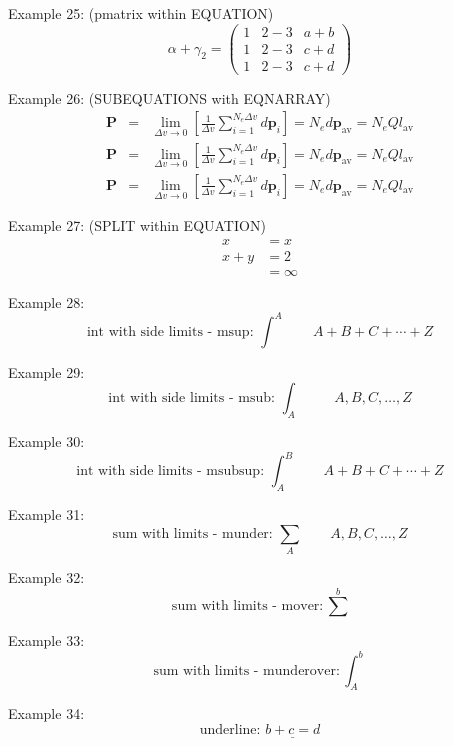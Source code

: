 \documentclass{book}
\begin{document}
\noindent Example 25: (pmatrix within EQUATION)
\begin{equation*}
\alpha + \gamma_{2} = \begin{pmatrix}
1 &2-3 &a+b\\ 
1 &2-3 &c+d\\
1 &2-3 &c+d
\end{pmatrix}
\end{equation*}

\noindent Example 26: (SUBEQUATIONS with EQNARRAY)
\begin{subequations}
\begin{eqnarray}
\mathbf{P} &= &\lim_{\Delta v\to 0} \left[\frac{1}{\Delta v}\sum_{i=1}^{N_{e}\Delta v}d\mathbf{p}_{i}\right] = N_{e}d\mathbf{p}_{\mathrm{av}} = N_{e}Q{l}_{\mathrm{av}} \nonumber \\
\mathbf{P} &= &\lim_{\Delta v\to 0} \left[\frac{1}{\Delta v}\sum_{i=1}^{N_{e}\Delta v}d\mathbf{p}_{i}\right] = N_{e}d\mathbf{p}_{\mathrm{av}} = N_{e}Q{l}_{\mathrm{av}} \\
\mathbf{P} &= &\lim_{\Delta v\to 0} \left[\frac{1}{\Delta v}\sum_{i=1}^{N_{e}\Delta v}d\mathbf{p}_{i}\right] = N_{e}d\mathbf{p}_{\mathrm{av}} = N_{e}Q{l}_{\mathrm{av}} 
\end{eqnarray}
\end{subequations}

\noindent Example 27: (SPLIT within EQUATION)
\begin{equation}
\begin{split}
x &= x\\
x + y&=2 \\
  &= \infty
\end{split}
\end{equation}

\noindent Example 28:
\[
\mbox{int with side limits - msup: } \int^{A}\qquad A + B + C + \cdots + Z
\]

\noindent Example 29:
\[\mbox{int with side limits - msub: } \int_{A}\qquad A, B, C, \ldots, Z \]

\noindent Example 30:
\[
\mbox{int with side limits - msubsup: } \int_{A}^{B}\qquad A + B + C + \cdots + Z
\]

\noindent Example 31:
\[\mbox{sum with limits - munder: } \sum_{A}\qquad A, B, C, \ldots, Z \]

\noindent Example 32:
\[\mbox{sum with limits - mover: } \sum^{b}\]

\noindent Example 33:
\[\mbox{sum with limits - munderover: } \int_{A}^{b}\]

\noindent Example 34:
\[\mbox{underline: }\underline{b+c=d}\]
\end{document}
